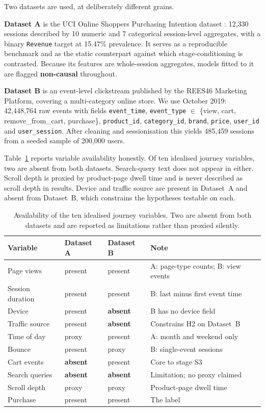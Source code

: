 \documentclass[review,3p,times,authoryear]{elsarticle}   %
\begin{document}
Two datasets are used, at deliberately different grains.

\textbf{Dataset A} is the UCI Online Shoppers Purchasing Intention dataset
\citep{sakar2019real}: 12,330 sessions described by 10 numeric and 7 categorical
session-level aggregates, with a binary \texttt{Revenue} target at 15.47\%
prevalence. It serves as a reproducible benchmark and as the static counterpart
against which stage-conditioning is contrasted. Because its features are
whole-session aggregates, models fitted to it are flagged \textbf{non-causal}
throughout.

\textbf{Dataset B} is an event-level clickstream published by the REES46 Marketing
Platform, covering a multi-category online store. We use October 2019: 42,448,764
raw events with fields \texttt{event\_time}, \texttt{event\_type} $\in$
\{view, cart, remove\_from\_cart, purchase\}, \texttt{product\_id},
\texttt{category\_id}, \texttt{brand}, \texttt{price}, \texttt{user\_id} and
\texttt{user\_session}. After cleaning and sessionisation this yields 485,459
sessions from a seeded sample of 200,000 users.

Table~\ref{tab:availability} reports variable availability honestly. Of ten
idealised journey variables, two are absent from both datasets. Search-query text
does not appear in either. Scroll depth is proxied by product-page dwell time and
is never described as scroll depth in results. Device and traffic source are
present in Dataset~A and absent from Dataset~B, which constrains the hypotheses
testable on each.

\begin{table}[t]
\centering
\caption{Availability of the ten idealised journey variables. Two are absent from
both datasets and are reported as limitations rather than proxied silently.}
\label{tab:availability}
\small
\begin{tabular}{@{}lllp{5.1cm}@{}}
\toprule
\textbf{Variable} & \textbf{Dataset A} & \textbf{Dataset B} & \textbf{Note} \\
\midrule
Page views      & present & present & A: page-type counts; B: view events \\
Session duration& present & present & B: last minus first event time \\
Device          & present & \textbf{absent} & B has no device field \\
Traffic source  & present & \textbf{absent} & Constrains H2 on Dataset~B \\
Time of day     & proxy   & present & A: month and weekend only \\
Bounce          & present & proxy   & B: single-event sessions \\
Cart events     & \textbf{absent} & present & Core to stage S3 \\
Search queries  & \textbf{absent} & \textbf{absent} & Limitation; no proxy claimed \\
Scroll depth    & proxy   & proxy   & Product-page dwell time \\
Purchase        & present & present & The label \\
\bottomrule
\end{tabular}
\end{table}
\end{document}
